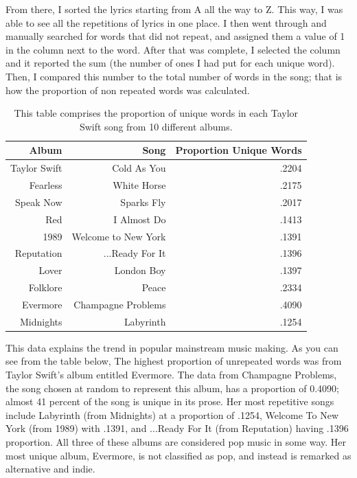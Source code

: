 \documentclass[12pt]{article}
\begin{document}
From there, I sorted the lyrics starting from A all the way to Z. This way, I was able to see all the repetitions of lyrics in one place. I then went through and manually searched for words that did not repeat, and assigned them a value of 1 in the column next to the word. After that was complete, I selected the column and it reported the sum (the number of ones I had put for each unique word). Then, I compared this number to the total number of words in the song; that is how the proportion of non repeated words was calculated.



\begin{table}[tbp]
  \caption{This table comprises the proportion of unique words in each Taylor Swift song from 10 different albums.}
  \label{tab:rv}
\centering
\begin{tabular}{rrr}
  \toprule
Album & Song & Proportion Unique Words \\ 
  \midrule
Taylor Swift & Cold As You & .2204 \\ 
  Fearless & White Horse & .2175 \\ 
  Speak Now & Sparks Fly & .2017 \\ 
  Red & I Almost Do & .1413 \\ 
  1989 & Welcome to New York & .1391 \\ 
  Reputation & ...Ready For It & .1396 \\ 
  Lover & London Boy & .1397 \\ 
  Folklore & Peace & .2334 \\ 
  Evermore & Champagne Problems & .4090 \\ 
  Midnights & Labyrinth & .1254 \\ 
   \bottomrule
\end{tabular}
\end{table}




This data explains the trend in popular mainstream music making. As you can see from the table below, The highest proportion of unrepeated words was from Taylor Swift's album entitled Evermore. The data from Champagne Problems, the song chosen at random to represent this album, has a proportion of 0.4090; almost 41 percent of the song is unique in its prose. Her most repetitive songs include Labyrinth (from Midnights) at a proportion of .1254, Welcome To New York (from 1989) with .1391, and ...Ready For It (from Reputation) having .1396 proportion. All three of these albums are considered pop music in some way. Her most unique album, Evermore, is not classified as pop, and instead is remarked as alternative and indie. 
\end{document}
